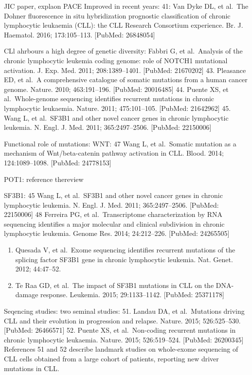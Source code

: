 \documentclass[11pt, a4paper, twosided]{book}
\providecommand{\tightlist}{%
  \setlength{\itemsep}{0pt}\setlength{\parskip}{0pt}}
\begin{document}
JIC paper, explaon PACE
Improved in recent years: 41: Van Dyke DL, et al.~The Dohner fluorescence in situ hybridization prognostic classification of chronic lymphocytic leukaemia (CLL): the CLL Research Consortium experience. Br. J. Haematol. 2016; 173:105--113. {[}PubMed: 26848054{]}

CLl ahrbours a high degree of genetic diversity:
Fabbri G, et al.~Analysis of the chronic lymphocytic leukemia coding genome: role of NOTCH1 mutational activation. J. Exp. Med. 2011; 208:1389--1401. {[}PubMed: 21670202{]}
43. Pleasance ED, et al.~A comprehensive catalogue of somatic mutations from a human cancer genome. Nature. 2010; 463:191--196. {[}PubMed: 20016485{]}
44. Puente XS, et al.~Whole-genome sequencing identifies recurrent mutations in chronic lymphocytic leukaemia. Nature. 2011; 475:101--105. {[}PubMed: 21642962{]}
45. Wang L, et al.~SF3B1 and other novel cancer genes in chronic lymphocytic leukemia. N. Engl. J. Med. 2011; 365:2497--2506. {[}PubMed: 22150006{]}

Functional role of mutations:
WNT: 47 Wang L, et al.~Somatic mutation as a mechanism of Wnt/beta-catenin pathway activation in CLL. Blood. 2014; 124:1089--1098. {[}PubMed: 24778153{]}

POT1: reference thereview

SF3B1:
45 Wang L, et al.~SF3B1 and other novel cancer genes in chronic lymphocytic leukemia. N. Engl. J. Med. 2011; 365:2497--2506. {[}PubMed: 22150006{]}
48 Ferreira PG, et al.~Transcriptome characterization by RNA sequencing identifies a major molecular and clinical subdivision in chronic lymphocytic leukemia. Genome Res. 2014; 24:212--226. {[}PubMed: 24265505{]}
\begin{enumerate}
\def\labelenumi{\arabic{enumi}.}
\setcounter{enumi}{48}
\tightlist
\item
  Quesada V, et al.~Exome sequencing identifies recurrent mutations of the splicing factor SF3B1 gene in chronic lymphocytic leukemia. Nat. Genet. 2012; 44:47--52.
\item
  Te Raa GD, et al.~The impact of SF3B1 mutations in CLL on the DNA-damage response. Leukemia. 2015; 29:1133--1142. {[}PubMed: 25371178{]}
\end{enumerate}
Seqencing studies:
two seminal studies:
51. Landau DA, et al.~Mutations driving CLL and their evolution in progression and relapse. Nature. 2015; 526:525--530. {[}PubMed: 26466571{]}
52. Puente XS, et al.~Non-coding recurrent mutations in chronic lymphocytic leukaemia. Nature. 2015; 526:519--524. {[}PubMed: 26200345{]} References 51 and 52 describe landmark studies on whole-exome sequencing of CLL cells obtained from a large cohort of patients, reporting new driver mutations in CLL.
\end{document}
